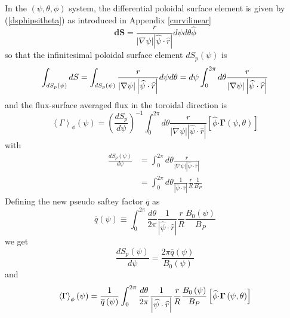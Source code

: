 In the $\left( \psi,\theta,\phi\right) $ system, the differential poloidal
surface element is given by (\ref{dsphipsitheta}) as introduced in Appendix
\ref{curvilinear}
\begin{equation}
\mathbf{dS}=\frac{r}{\left| \nabla\psi\right| \left| \widehat{\psi}\cdot%
\widehat{r}\right| }d\psi d\theta\widehat{\phi}
\end{equation}
so that the infinitesimal poloidal surface element $dS_{p}\left( \psi\right)
$ is
\begin{equation}
\int_{dS_{p}\left( \psi\right) }dS=\int_{dS_{p}\left( \psi\right) }\frac{r}{%
\left| \nabla\psi\right| \left| \widehat{\psi}\cdot\widehat {r}\right| }
d\psi d\theta=d\psi\int_{0}^{2\pi}d\theta\frac{r}{\left| \nabla\psi\right|
\left| \widehat{\psi}\cdot\widehat{r}\right| }
\end{equation}
and the flux-surface averaged flux in the toroidal direction is
\begin{equation}
\left\langle \Gamma\right\rangle _{\phi}\left( \psi\right) =\left( \frac{
dS_{p}}{d\psi}\right) ^{-1}\int_{0}^{2\pi}d\theta\frac{r}{\left|
\nabla\psi\right| \left| \widehat{\psi}\cdot\widehat{r}\right| }\left[
\widehat{\phi}\mathbf{\cdot\Gamma}\left( \psi,\theta\right) \right]
\label{fsavsurf}
\end{equation}
with
\begin{align}
\frac{dS_{p}\left( \psi\right) }{d\psi} & =\int_{0}^{2\pi}d\theta\frac
{r}{\left| \nabla\psi\right| \left| \widehat{\psi}\cdot\widehat{r}\right| }
\\
& =\int_{0}^{2\pi}d\theta\frac{1}{\left| \widehat{\psi}\cdot\widehat
{r}\right| }\frac{r}{R}\frac{1}{B_{P}}
\end{align}
Defining the new pseudo saftey factor $\overline{q}$ as
\begin{equation}
\overline{q}\left( \psi\right) \equiv\int_{0}^{2\pi}\frac{d\theta}{2\pi }%
\frac{1}{\left| \widehat{\psi}\cdot\widehat{r}\right| }\frac{r}{R}\frac{
B_{0}\left( \psi\right) }{B_{P}}
\end{equation}
we get
\begin{equation}
\frac{dS_{p}\left( \psi\right) }{d\psi}=\frac{2\pi\overline{q}\left(
\psi\right) }{B_{0}\left( \psi\right) }
\end{equation}
and
\begin{equation}
\left\langle \Gamma\right\rangle _{\phi}\left( \psi\right) =\frac {1}{%
\overline{q}\left( \psi\right) }\int_{0}^{2\pi}\frac{d\theta}{2\pi}\frac{1}{%
\left| \widehat{\psi}\cdot\widehat{r}\right| }\frac{r}{R}\frac{B_{0}\left(
\psi\right) }{B_{P}}\left[ \widehat{\phi}\mathbf{\cdot \Gamma}\left(
\psi,\theta\right) \right]  \label{surffluxsurfav}
\end{equation}

